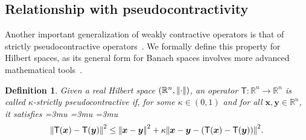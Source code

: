 \documentclass[journal,twoside,web]{ieeecolor}
\newcommand{\norm}[1]{{\left\vert\kern-0.25ex\left\vert #1\right\vert\kern-0.25ex\right\vert}}
\newcommand{\rea }{\mathbb{R}}
\newcommand{\xb}{\boldsymbol{x}}
\newcommand{\yb}{\boldsymbol{y}}
\newcommand{\Ts}{\mathsf{T}}
\newcommand{\sPC}{\textsc{sPC}}
\newtheorem{defn}{Definition}
\begin{document}
\subsection{Relationship with pseudocontractivity}
%
Another important generalization of weakly contractive operators is that of strictly pseudocontractive operators~\cite{Belgioioso18}. We formally define this property for Hilbert spaces, as its general form for Banach spaces involves more advanced mathematical tools~\cite{deplano25withapp}.
%
\begin{defn}\label{def:sPC}
%
\cite[Definition 4]{Belgioioso18} Given a real Hilbert space ${(\rea^n,\norm{\cdot})}$, an operator ${\Ts:\rea^n\rightarrow\rea^n}$ is called $\kappa$-strictly pseudocontractive if, for some $\kappa\in(0,1)$ and for all ${\xb,\yb \in \rea^n}$, it satisfies
%
\begingroup
\medmuskip=3mu
\thinmuskip=3mu
\thickmuskip=3mu
\begin{equation*}
\norm{\Ts(\xb)-\Ts(\yb)}^2 \leq  \norm{\xb-\yb}^2 + \kappa \norm{\xb-\yb-(\Ts(\xb)-\Ts(\yb))}^2.
\end{equation*}
\endgroup
%
\end{defn}
\end{document}
